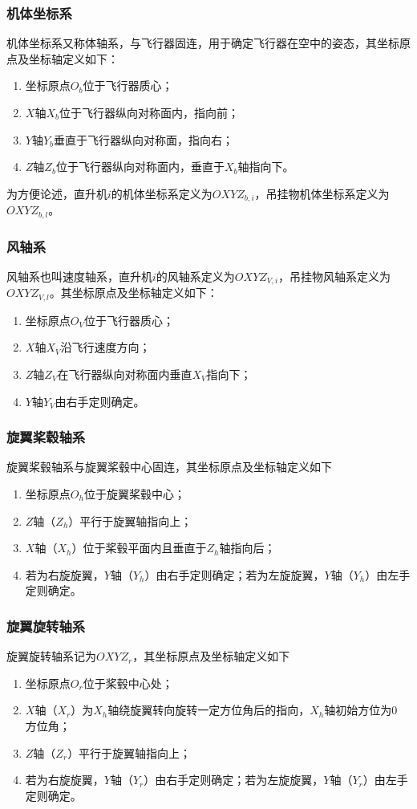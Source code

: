 \subsubsection{机体坐标系}
机体坐标系又称体轴系，与飞行器固连，用于确定飞行器在空中的姿态，其坐标原点及坐标轴定义如下：
\begin{enumerate}
  \item 坐标原点$O_{b}$位于飞行器质心；
  \item $X$轴$X_{b}$位于飞行器纵向对称面内，指向前；
  \item $Y$轴$Y_{b}$垂直于飞行器纵向对称面，指向右；
  \item $Z$轴$Z_{b}$位于飞行器纵向对称面内，垂直于$X_{b}$轴指向下。
\end{enumerate}

为方便论述，直升机$i$的机体坐标系定义为$OXYZ_{b,i}$，吊挂物机体坐标系定义为$OXYZ_{b,l}$。

\subsubsection{风轴系}
风轴系也叫速度轴系，直升机$i$的风轴系定义为$OXYZ_{V,i}$，吊挂物风轴系定义为$OXYZ_{V,l}$。其坐标原点及坐标轴定义如下：
\begin{enumerate}
  \item 坐标原点$O_V$位于飞行器质心；
  \item $X$轴$X_{V}$沿飞行速度方向；
  \item $Z$轴$Z_{V}$在飞行器纵向对称面内垂直$X_{V}$指向下；
  \item $Y$轴$Y_{V}$由右手定则确定。
\end{enumerate}

\subsubsection{旋翼桨毂轴系}
旋翼桨毂轴系与旋翼桨毂中心固连，其坐标原点及坐标轴定义如下
\begin{enumerate}
  \item 坐标原点$O_h$位于旋翼桨毂中心；
  \item $Z$轴（$Z_h$）平行于旋翼轴指向上；
  \item $X$轴（$X_h$）位于桨毂平面内且垂直于$Z_h$轴指向后；
  \item 若为右旋旋翼，$Y$轴（$Y_h$）由右手定则确定；若为左旋旋翼，$Y$轴（$Y_h$）由左手定则确定。
\end{enumerate}
\subsubsection{旋翼旋转轴系}
旋翼旋转轴系记为$OXYZ_r$，其坐标原点及坐标轴定义如下
\begin{enumerate}
  \item 坐标原点$O_r$位于桨毂中心处；
  \item $X$轴（$X_r$）为$X_h$轴绕旋翼转向旋转一定方位角后的指向，$X_h$轴初始方位为0 \degree 方位角；
  \item $Z$轴（$Z_r$）平行于旋翼轴指向上；
  \item 若为右旋旋翼，$Y$轴（$Y_r$）由右手定则确定；若为左旋旋翼，$Y$轴（$Y_r$）由左手定则确定。
\end{enumerate}
